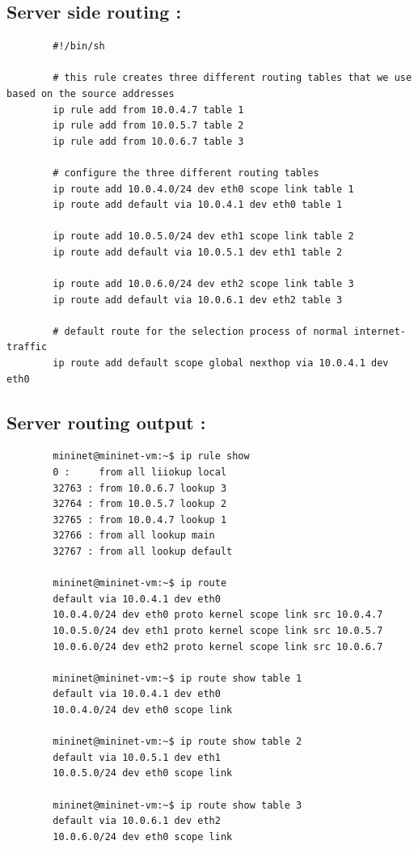 \documentclass[a4paper,11pt]{article}
\begin{document}
	 	\subsection{Server side routing :}
	 	\label{subsec:serverroute}
	 	\begin{lstlisting}
	 	#!/bin/sh

	 	# this rule creates three different routing tables that we use based on the source addresses
	 	ip rule add from 10.0.4.7 table 1
	 	ip rule add from 10.0.5.7 table 2
	 	ip rule add from 10.0.6.7 table 3

	 	# configure the three different routing tables
	 	ip route add 10.0.4.0/24 dev eth0 scope link table 1
	 	ip route add default via 10.0.4.1 dev eth0 table 1

	 	ip route add 10.0.5.0/24 dev eth1 scope link table 2
	 	ip route add default via 10.0.5.1 dev eth1 table 2

	 	ip route add 10.0.6.0/24 dev eth2 scope link table 3
	 	ip route add default via 10.0.6.1 dev eth2 table 3

	 	# default route for the selection process of normal internet-traffic
	 	ip route add default scope global nexthop via 10.0.4.1 dev eth0
	 	\end{lstlisting}

	 	\subsection{Server routing output :}
	 	\label{subsec:serverrouteout}
	 	\begin{lstlisting}
	 	mininet@mininet-vm:~$ ip rule show
	 	0 : 	from all liiokup local
	 	32763 : from 10.0.6.7 lookup 3
	 	32764 : from 10.0.5.7 lookup 2
	 	32765 : from 10.0.4.7 lookup 1
	 	32766 : from all lookup main
	 	32767 : from all lookup default

	 	mininet@mininet-vm:~$ ip route
	 	default via 10.0.4.1 dev eth0
	 	10.0.4.0/24 dev eth0 proto kernel scope link src 10.0.4.7
	 	10.0.5.0/24 dev eth1 proto kernel scope link src 10.0.5.7
	 	10.0.6.0/24 dev eth2 proto kernel scope link src 10.0.6.7

	 	mininet@mininet-vm:~$ ip route show table 1
	 	default via 10.0.4.1 dev eth0
	 	10.0.4.0/24 dev eth0 scope link

	 	mininet@mininet-vm:~$ ip route show table 2
	 	default via 10.0.5.1 dev eth1
	 	10.0.5.0/24 dev eth0 scope link

	 	mininet@mininet-vm:~$ ip route show table 3
	 	default via 10.0.6.1 dev eth2
	 	10.0.6.0/24 dev eth0 scope link
	 	\end{lstlisting}
\end{document}
